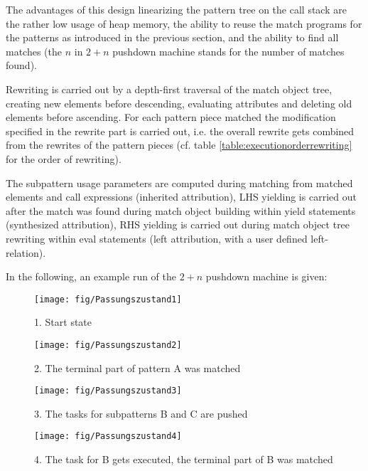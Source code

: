 The advantages of this design linearizing the pattern tree on the call stack are the rather low usage of heap memory, the ability to reuse the match programs for the patterns as introduced in the previous section, and the ability to find all matches (the $n$ in $2+n$ pushdown machine stands for the number of matches found).

Rewriting is carried out by a depth-first traversal of the match object tree, creating new elements before descending, evaluating attributes and deleting old elements before ascending. For each pattern piece matched the modification specified in the rewrite part is carried out, i.e. the overall rewrite gets combined from the rewrites of the pattern pieces (cf. table \ref{table:executionorderrewriting} for the order of rewriting).

The subpattern usage parameters are computed during matching from matched elements and call expressions (inherited attribution), LHS yielding is carried out after the match was found during match object building within yield statements (synthesized attribution), RHS yielding is carried out during match object tree rewriting within eval statements (left attribution, with a user defined left-relation).

In the following, an example run of the $2+n$ pushdown machine is given:

\vspace{2cm} %

\begin{figure}[htbp]
  \centering
  \texttt{[image: fig/Passungszustand1]}
  \caption{1. Start state}
  \label{figmatchingstate1}
\end{figure}

\begin{figure}[htbp]
  \centering
  \texttt{[image: fig/Passungszustand2]}
  \caption{2. The terminal part of pattern A was matched}
  \label{figmatchingstate2}
\end{figure}

\begin{figure}[htbp]
  \centering
  \texttt{[image: fig/Passungszustand3]}
  \caption{3. The tasks for subpatterns B and C are pushed}
  \label{figmatchingstate3}
\end{figure}

\begin{figure}[htbp]
  \centering
  \texttt{[image: fig/Passungszustand4]}
  \caption{4. The task for B gets executed, the terminal part of B was matched}
  \label{figmatchingstate4}
\end{figure}


